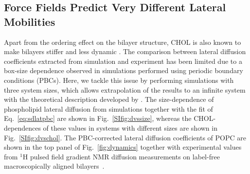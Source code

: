 \documentclass[journal=jctcce]{achemso}
\begin{document}
\subsection{Force Fields Predict Very Different Lateral Mobilities}

Apart from the ordering effect on the bilayer structure, CHOL is also known to make bilayers stiffer and less dynamic \cite{rog2009ordering,filippov2003effect,filippov2003influence}. The comparison between lateral diffusion coefficients extracted from simulation and experiment has been limited due to a box-size dependence observed in simulations performed using periodic boundary conditions (PBCs)\cite{vogele2016divergent,vogele2018hydrodynamics,camley2015strong}. Here, we tackle this issue by performing simulations with three system sizes, which allows extrapolation of the results to an infinite system with the theoretical description developed by \citeauthor{vogele2016divergent} \cite{vogele2016divergent,vogele2018hydrodynamics}. The size-dependence of phospholipid lateral diffusion from simulations together with the fit of Eq.~\eqref{eq:sdlatpbc} are shown in Fig.~\ref{SIfig:dvssize}, whereas the CHOL-dependences of these values in systems with different sizes are shown in Fig.~\ref{SIfig:dvschol}. The PBC-corrected lateral diffusion coefficients of POPC are shown in the top panel of Fig.~\ref{fig:dynamics} together with experimental values from $^1$H pulsed field gradient NMR diffusion measurements on label-free macroscopically aligned bilayers~\cite{filippov2003influence,filippov2003effect}. 
\end{document}
